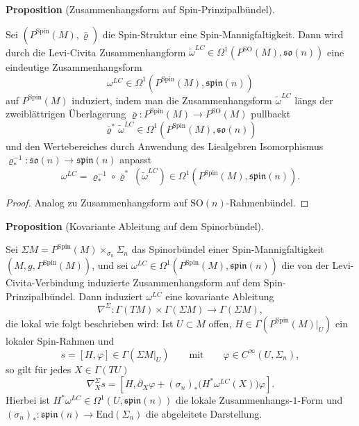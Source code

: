 \documentclass[10pt, letterpaper]{article}
\newcommand{\End}{\mathrm{End}}
\newcommand{\SO}{\mathrm{SO}}
\newcommand{\Spin}{\mathrm{Spin}}
\newcommand{\CustomHeading}[3]{%
  \par\medskip\noindent%
  \textbf{#1 #2} \textnormal{(#3)}.\enskip%
}
\newenvironment{PROP}[2]{\CustomHeading{Proposition}{#1}{#2}}{}
\begin{document}
\begin{PROP}{}{Zusammenhangsform auf Spin-Prinzipalbündel}
  Sei $(P^\Spin(M),\bar{\varrho})$ die Spin-Struktur eine Spin-Mannigfaltigkeit. Dann wird durch die Levi-Civita Zusammenhangform $\widetilde\omega^{LC}\in\Omega^1(P^\SO(M),\mathfrak{so}(n))$ eine eindeutige Zusammenhangsform 
  $$\omega^{LC}\in \Omega^1(P^{\Spin}(M),\mathfrak{spin}(n))$$ 
  auf $P^\Spin(M)$ induziert, indem man die Zusammenhangsform $\widetilde\omega^{LC}$ längs der zweiblättrigen Überlagerung $\bar\varrho: P^\Spin(M) \to P^\SO(M)$ pullbackt 
  $${\bar\varrho}^*\widetilde\omega^{LC}\in \Omega^1(P^\Spin(M),\mathfrak{so}(n))$$
  und den Wertebereiches durch Anwendung des Liealgebren Isomorphismus $\varrho_*^{-1}:\mathfrak{so}(n)\to\mathfrak{spin}(n)$ anpasst
  $$\omega^{LC}=\varrho_*^{-1}\circ \bar\varrho^*\ \left(\widetilde \omega^{LC}\right)\in \Omega^1(P^\Spin(M),\mathfrak{spin}(n)).$$

\end{PROP}

\begin{proof}
  Analog zu Zusammenhangsform auf $\SO(n)$-Rahmenbündel.
\end{proof}



\begin{PROP}{}{Kovariante Ableitung auf dem Spinorbündel}
Sei $\Sigma M= P^\Spin(M)\times_{\sigma_n}\Sigma_n$ das Spinorbündel einer Spin-Mannigfaltigkeit \((M,g,P^\Spin(M))\), und sei $\omega^{LC}\in \Omega^1(P^\Spin(M),\mathfrak{spin}(n))$ die von der Levi-Civita-Verbindung induzierte Zusammenhangsform auf dem Spin-Prinzipalbündel. Dann induziert \(\omega^{LC}\) eine kovariante Ableitung
\[
\nabla^\Sigma:\Gamma(TM)\times \Gamma(\Sigma M)\to \Gamma(\Sigma M),
\]
die lokal wie folgt beschrieben wird: Ist \(U\subset M\) offen, \(H\in \Gamma(P^\Spin(M)|_U)\) ein lokaler Spin-Rahmen und
\[
s=[H,\varphi]\in \Gamma(\Sigma M|_U)
\qquad\text{mit}\qquad
\varphi\in C^\infty(U,\Sigma_n),
\]
so gilt für jedes \(X\in \Gamma(TU)\)
\[
\nabla_X^\Sigma s
=
\left[H,\partial_X\varphi+(\sigma_n)_*\bigl(H^*\omega^{LC}(X)\bigr)\varphi\right].
\]
Hierbei ist $H^*\omega^{LC}\in \Omega^1(U,\mathfrak{spin}(n))$ die lokale Zusammenhangs-\(1\)-Form und $(\sigma_n)_*:\mathfrak{spin}(n)\to \End(\Sigma_n)$ die abgeleitete Darstellung.
\end{PROP}
\end{document}

